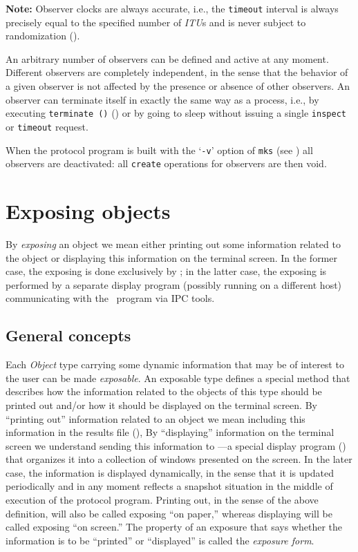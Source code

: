 \medskip

\noindent
{\bf Note:} Observer clocks are always accurate, i.e., the
{\tt timeout} interval is always precisely equal to the specified
number of {\em ITU\/}s and is never subject to randomization
().

\medskip

An arbitrary number of observers can be defined and active at any moment.
Different observers are completely independent, in the sense that the
behavior of a given observer is not affected by the presence or absence of
other observers.
An observer can terminate itself in exactly the same way as a
process, i.e.,
by executing {\tt terminate~()} ()
or by going to sleep without issuing a single
{\tt inspect} or {\tt timeout} request.

When the protocol program is built with the `{\tt -v}' option of {\tt mks}
(see )
all observers are deactivated: all {\tt create}
operations for observers are then void.

\section{Exposing objects}
\label{rm_ex}

By {\em exposing\/} an object we mean either printing out some information
related to the object or displaying this information on the terminal
screen.
In the former case, the exposing is done exclusively by \smurph; in the
latter case, the exposing is performed by a separate
display program (possibly running on a different host)
communicating with the \smurph\ program via IPC tools.

\subsection{General concepts}
\label{rm_ex_gc}

Each {\em Object\/} type
carrying some dynamic information that may be of interest
to the user can be made {\em exposable}.
An exposable type defines a special method that describes how the
information related to the objects of this type
should be printed out and/or how it
should be displayed on the terminal screen.
By ``printing out'' information related to an object we mean
including this information in the results file (),
By ``displaying'' information on the terminal screen we understand
sending this information to \dsd---a special
display program () that organizes it into a
collection of windows presented on the screen.
In the later case, the information is displayed dynamically, in the sense
that it is updated periodically and in any moment reflects a snapshot
situation in the middle of execution of the protocol program.
Printing out, in the sense of the above definition, will also be called
exposing ``on paper,'' whereas displaying
will be called exposing ``on screen.''
The property of an exposure that says whether the information is to be
``printed'' or ``displayed'' is called the {\em exposure form}.

